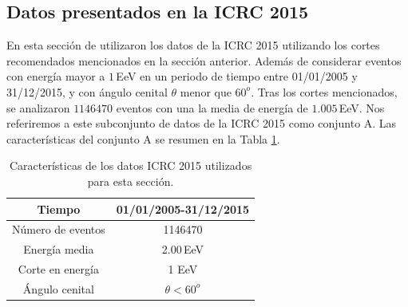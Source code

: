 	\subsection{Datos presentados en la ICRC 2015}\label{icrc2015}
	En esta sección de utilizaron los datos de la ICRC 2015 utilizando los cortes recomendados mencionados en la sección anterior. Además de considerar eventos con energía mayor a $1\,$EeV en un periodo de tiempo entre 01/01/2005 y 31/12/2015, y con ángulo cenital $\theta$ menor que $60^o$.  Tras los cortes mencionados, se analizaron $1146470$ eventos con una la media de energía de $1.005\,$EeV. Nos referiremos a este subconjunto de datos de la ICRC 2015  como conjunto A. Las características del conjunto A se resumen en la Tabla \ref{tabla:caracteristicas_ICRC_2015}.
			\begin{table}[H]
				\centering
				\begin{tabular}{|c|c|}
				\hline
				\textbf{Tiempo}     & \textbf{01/01/2005-31/12/2015} \\ \hline
				Número de eventos   &   1146470							\\ \hline 
				Energía media       &   2.00\,EeV       				\\ \hline  %
				Corte en energía    &  1 EeV        				\\ \hline 
				Ángulo cenital		& $\theta < 60^o$ 				\\ \hline
				\end{tabular}
			\caption{Características de los datos ICRC 2015 utilizados para esta sección.} \label{tabla:caracteristicas_ICRC_2015}
			\end{table}

